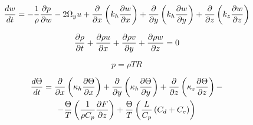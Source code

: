 \begin{equation}
\label{mom_conserv_turb_w}
    \displaystyle\frac{d w}{d t} = -\frac{1}{\rho}\displaystyle\frac{\partial p}{\partial w} - 2\Omega_yu +  
    \frac{\partial}{\partial x} \left( k_h \displaystyle\frac{\partial w}{\partial x} \right) + 
    \frac{\partial}{\partial y} \left( k_h \displaystyle\frac{\partial w}{\partial y} \right) + 
    \frac{\partial}{\partial z} \left( k_z \displaystyle\frac{\partial w}{\partial z} \right)
\end{equation}

\begin{equation}
\label{mass_conserv_turb}
    \displaystyle\frac{\partial \rho}{\partial t} + \displaystyle\frac{\partial \rho u}{\partial x} + \displaystyle\frac{\partial \rho v}{\partial y} + \displaystyle\frac{\partial \rho w}{\partial z} = 0 
\end{equation}

\begin{equation}
\label{ideal_gas}
    p = \rho TR 
\end{equation}

\begin{multline}
    \label{temp_conserv_turb}
    \displaystyle\frac{d \Theta}{d t} =  
    \frac{\partial}{\partial x} \left( \kappa_h \displaystyle\frac{\partial \Theta}{\partial x} \right) + 
    \frac{\partial}{\partial y} \left( \kappa_h \displaystyle\frac{\partial \Theta}{\partial y} \right) + 
    \frac{\partial}{\partial z} \left( \kappa_z \displaystyle\frac{\partial \Theta}{\partial z} \right) - \\
  - \frac{\Theta}{T} \left( \frac{1}{\rho C_p} \displaystyle\frac{\partial F}{\partial z} \right) + 
    \frac{\Theta}{T} \left( \frac{L}{C_p} \left( C_d + C_e \right) \right)
\end{multline}


